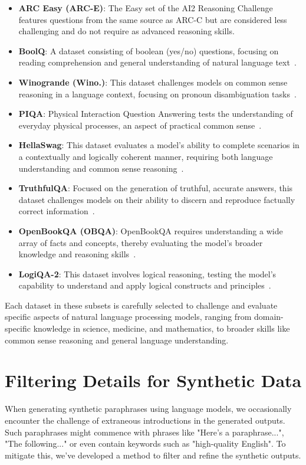 \documentclass[table]{article}
\begin{document}
\begin{itemize}
\item \textbf{ARC Easy (ARC-E)}: The Easy set of the AI2 Reasoning Challenge~\citep{allenai:arc} features questions from the same source as ARC-C but are considered less challenging and do not require as advanced reasoning skills.
\item \textbf{BoolQ}: A dataset consisting of boolean (yes/no) questions, focusing on reading comprehension and general understanding of natural language text~\citep{clark-etal-2019-boolq}.
\item \textbf{Winogrande (Wino.)}: This dataset challenges models on common sense reasoning in a language context, focusing on pronoun disambiguation tasks~\citep{ai2:winogrande}.
\item \textbf{PIQA}: Physical Interaction Question Answering tests the understanding of everyday physical processes, an aspect of practical common sense~\citep{Bisk2020}.
\item \textbf{HellaSwag}: This dataset evaluates a model's ability to complete scenarios in a contextually and logically coherent manner, requiring both language understanding and common sense reasoning~\citep{zellers2019hellaswag}.
\item \textbf{TruthfulQA}: Focused on the generation of truthful, accurate answers, this dataset challenges models on their ability to discern and reproduce factually correct information~\citep{lin2021truthfulqa}.
\item \textbf{OpenBookQA (OBQA)}: OpenBookQA requires understanding a wide array of facts and concepts, thereby evaluating the model's broader knowledge and reasoning skills~\citep{OpenBookQA2018}.
\item \textbf{LogiQA-2}: This dataset involves logical reasoning, testing the model's capability to understand and apply logical constructs and principles~\citep{logiqa2}.
\end{itemize}

Each dataset in these subsets is carefully selected to challenge and evaluate specific aspects of natural language processing models, ranging from domain-specific knowledge in science, medicine, and mathematics, to broader skills like common sense reasoning and general language understanding.

\section{Filtering Details for Synthetic Data}
When generating synthetic paraphrases using language models, we occasionally encounter the challenge of extraneous introductions in the generated outputs. Such paraphrases might commence with phrases like "Here's a paraphrase...", "The following..." or even contain keywords such as "high-quality English". To mitigate this, we've developed a method to filter and refine the synthetic outputs.
\end{document}

